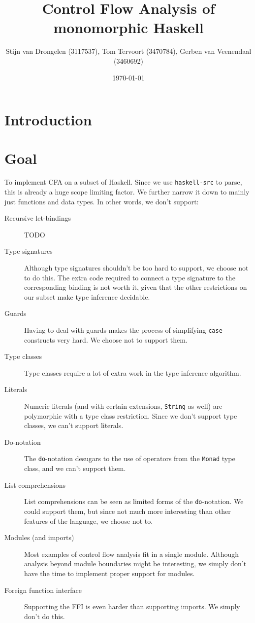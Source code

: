 \documentclass[a4paper]{scrartcl}
\title{Control Flow Analysis of monomorphic Haskell}
\author{Stijn van Drongelen {\tiny(3117537)},
        Tom Tervoort {\tiny(3470784)},
        Gerben van Veenendaal {\tiny(3460692)}}
\date{\today}
\begin{document}
\maketitle

\section{Introduction}
\section{Goal}

To implement CFA on a subset of Haskell. Since we use \texttt{haskell-src} to
parse, this is already a huge scope limiting factor. We further narrow it
down to mainly just functions and data types. In other words, we don't
support:

\begin{description}
\item[Recursive let-bindings]
    TODO
\item[Type signatures]
    Although type signatures shouldn't be too hard to support, we choose
    not to do this. The extra code required to connect a type signature to
    the corresponding binding is not worth it, given that the other restrictions
    on our subset make type inference decidable.
\item[Guards]
    Having to deal with guards makes the process of simplifying \texttt{case}
    constructs very hard. We choose not to support them.
\item[Type classes]
    Type classes require a lot of extra work in the type inference algorithm.
\item[Literals]
    Numeric literals (and with certain extensions, \texttt{String} as well)
    are polymorphic with a type class restriction. Since we don't support type
    classes, we can't support literals.
\item[Do-notation]
    The \texttt{do}-notation desugars to the use of operators from the \texttt{Monad}
    type class, and we can't support them.
\item[List comprehensions]
    List comprehensions can be seen as limited forms of the \texttt{do}-notation.
    We could support them, but since not much more interesting than other
    features of the language, we choose not to.
\item [Modules (and imports)]
    Most examples of control flow analysis fit in a single module. Although
    analysis beyond module boundaries might be interesting, we simply don't
    have the time to implement proper support for modules.
\item [Foreign function interface]
    Supporting the FFI is even harder than supporting imports. We simply don't
    do this.
\end{description}
\end{document}
